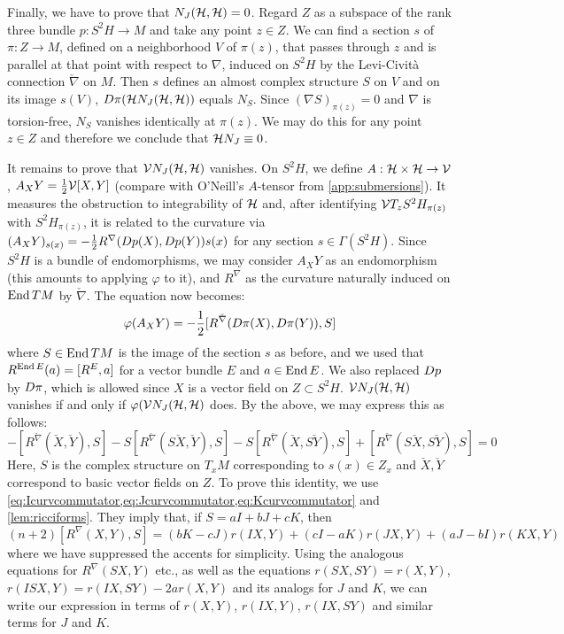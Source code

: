 \begin{myproof}
	Finally, we have to prove that $N_J(\mathcal{H},\mathcal{H})=0$. Regard $Z$ as a subspace of the rank three bundle $p:S^2H\to M$ and take any point $z\in Z$. We can find a section $s$ of $\pi: Z\to M$, defined on a neighborhood $V$ of $\pi(z)$, that passes through $z$ and is parallel at that point with respect to $\nabla$, induced on $S^2H$ by the Levi-Civit\`a connection $\check\nabla$ on $M$. Then $s$ defines an almost complex structure $S$ on $V$ and on its image $s(V)$, $D\pi(\mathcal{H} N_J(\mathcal{H},\mathcal{H}))$ equals $N_S$. Since $(\nabla S)_{\pi(z)}=0$ and $\nabla$ is torsion-free, $N_S$ vanishes identically at $\pi(z)$. We may do this for any point $z\in Z$ and therefore we conclude that $\mathcal{H} N_J\equiv 0$.
	
	It remains to prove that $\mathcal{V} N_J(\mathcal{H},\mathcal{H})$ vanishes. On $S^2H$, we define $A:\mathcal{H}\times \mathcal{H}\to \mathcal{V}$, $A_X Y=\frac{1}{2}\mathcal{V}[X,Y]$ (compare with O'Neill's $A$-tensor from \cref{app:submersions}). It measures the obstruction to integrability of $\mathcal{H}$ and, after identifying $\mathcal{V} T_z S^2H_{\pi(z)}$ with $S^2H_{\pi(z)}$, it is related to the curvature via $(A_X Y)_{s(x)}=-\frac{1}{2}R^\nabla(D p(X),D p(Y))s(x)$ for any section $s\in \Gamma(S^2H)$. Since $S^2H$ is a bundle of endomorphisms, we may consider $A_X Y$ as an endomorphism (this amounts to applying $\varphi$ to it), and $R^\nabla$ as the curvature naturally induced on $\operatorname{End} TM$ by $\check \nabla$. The equation now becomes:
	\begin{equation*}
		\varphi(A_XY)=-\frac{1}{2}[R^{\check\nabla}(D \pi(X), D \pi(Y)),S]
	\end{equation*} 
	where $S\in \operatorname{End} TM$ is the image of the section $s$ as before, and we used that $R^{\operatorname{End} E}(a)=[R^E,a]$ for a vector bundle $E$ and $a\in\operatorname{End} E$. We also replaced $D p$ by $D \pi$, which is allowed since $X$ is a vector field on $Z\subset S^2H$. $\mathcal{V}N_J(\mathcal{H},\mathcal{H})$ vanishes if and only if $\varphi(\mathcal{V}N_J(\mathcal{H},\mathcal{H})$ does. By the above, we may express this as follows:
	\begin{equation*}
		-[R^{\check{\nabla}}(\check X,\check Y),S]
		-S[R^{\check{\nabla}}(S\check X,\check Y),S]
		-S[R^{\check{\nabla}}(\check X,S\check Y),S]
		+[R^{\check{\nabla}}(S\check X,S\check Y),S]=0
	\end{equation*}
	Here, $S$ is the complex structure on $T_x M$ corresponding to $s(x)\in Z_x$ and $\check X,\check Y$ correspond to basic vector fields on $Z$. To prove this identity, we use \cref{eq:Icurvcommutator,eq:Jcurvcommutator,eq:Kcurvcommutator} and \cref{lem:ricciforms}. They imply that, if $S=aI+bJ+cK$, then
	\begin{equation*}
		(n+2)[R^{\nabla}(X,Y),S]
		=(bK-cJ)r(IX,Y) +(cI-aK)r(JX,Y)+(aJ-bI)r(KX,Y)
	\end{equation*}
	where we have suppressed the accents for simplicity. Using the analogous equations for $R^{\nabla}(SX,Y)$ etc., as well as the equations $r(SX,SY)=r(X,Y)$, $r(ISX,Y)=r(IX,SY)-2ar(X,Y)$ and its analogs for $J$ and $K$, we can write our expression in terms of $r(X,Y)$, $r(IX,Y)$, $r(IX,SY)$ and similar terms for $J$ and $K$. 
	

\end{myproof}
